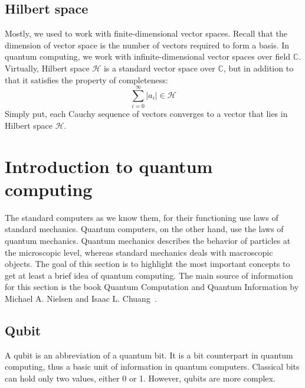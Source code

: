 \subsection*{Hilbert space}
Mostly, we used to work with finite-dimensional vector spaces. Recall that the dimension of vector space is the number of vectors required to form a basis. In quantum computing, we work with infinite-dimensional vector spaces over field $\mathbb{C}$. Virtually, Hilbert space $\mathcal{H}$ is a standard vector space over $\mathbb{C}$, but in addition to that it satisfies the property of completeness:
\begin{equation*}
  \sum_{i=0}^{\infty}\vert a_i \vert \in \mathcal{H}
\end{equation*}
Simply put, each Cauchy sequence of vectors converges to a vector that lies in Hilbert space $\mathcal{H}$.

\section{Introduction to quantum computing}
The standard computers as we know them, for their functioning use laws of standard mechanics. Quantum computers, on the other hand, use the laws of quantum mechanics. Quantum mechanics describes the behavior of particles at the microscopic level, whereas standard mechanics deals with macroscopic objects. The goal of this section is to highlight the most important concepts to get at least a brief idea of quantum computing. The main source of information for this section is the book Quantum Computation and Quantum Information by Michael A. Nielsen and Isaac L. Chuang~\cite{qc}.

\subsection*{Qubit}
A qubit is an abbreviation of a quantum bit. It is a bit counterpart in quantum computing, thus a basic unit of information in quantum computers. Classical bits can hold only two values, either 0 or 1. However, qubits are more complex.

